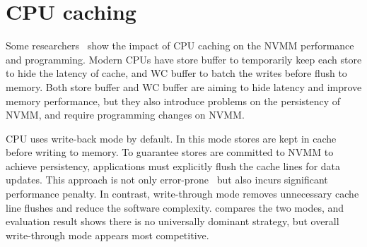 \section{CPU caching} 
\label{sec:caching}

Some researchers~\cite{CPUcaching}
show the impact of CPU caching on the NVMM performance
and programming. Modern CPUs have store buffer to temporarily keep each store
to hide the latency of cache, and WC buffer to batch the writes before
flush to memory. Both store buffer and WC buffer are aiming to hide latency
and improve memory performance, but they also introduce problems on the
persistency of NVMM, and require programming changes on NVMM.

CPU uses write-back mode by default. In this mode stores are kept in cache
before writing to memory. To guarantee stores are committed to NVMM to achieve
persistency, applications must explicitly flush the cache lines for data
updates. This approach is not only error-prone~\cite{singlelock}
but also incurs significant
performance penalty. In contrast, write-through mode removes unnecessary
cache line flushes and reduce the software complexity. \cite{CPUcaching}
compares the two 
modes, and evaluation result shows there is no universally dominant strategy,
but overall write-through mode appears most competitive.
